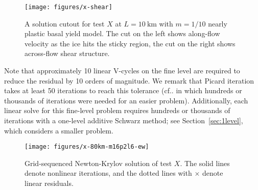 \documentclass[draft,lineno,jgrga]{AGUTeX}
\makeatletter
\DeclareRobustCommand\onedot{\futurelet\@let@token\@onedot}
\def\@onedot{\ifx\@let@token.\else.\null\fi\xspace}
\makeatother
\begin{document}
\begin{article}
\begin{figure}
  \texttt{[image: figures/x-shear]}
  \centering\caption{A solution cutout for test $X$ at $L=\SI{10}{\kilo\metre}$ with $m=1/10$ nearly plastic basal yield model.
    The cut on the left shows along-flow velocity as the ice hits the sticky region, the cut on the right shows across-flow shear structure.}\label{fig:xshear}
\end{figure}

Note that approximately 10 linear V-cycles on the fine level are required to reduce the residual by 10 orders of magnitude.
We remark that Picard iteration takes at least 50 iterations to reach this tolerance (cf\onedot \cite{desmedt2010using} in which hundreds or thousands of iterations were needed for an easier problem).  Additionally, each linear solve for this fine-level problem requires hundreds or thousands of iterations with a one-level additive Schwarz method; see Section~\ref{sec:1level}, which considers a smaller problem.

\begin{figure}
  \texttt{[image: figures/x-80km-m16p2l6-ew]}
  \centering\caption{Grid-sequenced Newton-Krylov solution of test $X$.  The solid lines denote nonlinear iterations, and the dotted lines with $\times$ denote linear residuals.}\label{fig:xgridseq}
\end{figure}


\end{article}
\end{document}
